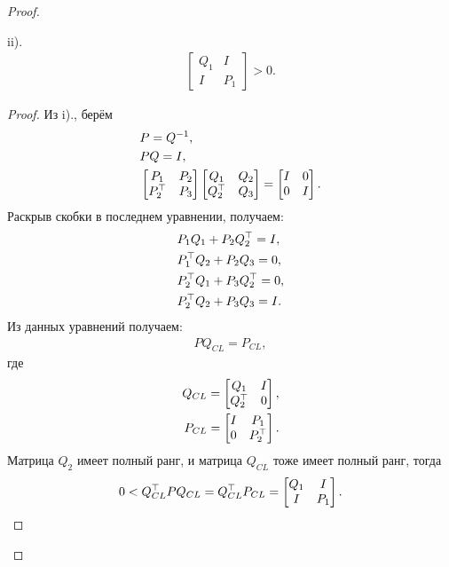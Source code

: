 \begin{proof}
\begin{lemma}
		ii). \begin{align*}
			\begin{bmatrix} 
				{Q}_{1} & I \\ 
				I & {P}_{1}
			\end{bmatrix} > 0.
		\end{align*}
	\end{lemma}
	\begin{proof}
		Из i)., берём 
		\begin{align}
			&{P} = {Q}^{-1},\\
			&{P}{Q}={I},\\
			&\begin{bmatrix} 
				{P}_{1} & {P}_{2}\\ 
				{P}_{2}^\top & {P}_{3} 
			\end{bmatrix}
			\begin{bmatrix} 
				{Q}_{1} & {Q}_{2} \\ 
				{Q}_{2}^\top & {Q}_{3}
			\end{bmatrix} = 
			\begin{bmatrix}
				{I} & 0 \\
				0 & {I}
			\end{bmatrix}.
		\end{align}
		Раскрыв скобки в последнем уравнении, получаем:
		\begin{align}
			&{P}_{1}{Q}_{1}+{P}_{2}{Q}_{2}^\top ={I},\\
			&{P}_{1}^\top{Q}_{2}+{P}_{2}{Q}_{3} =0\label{eq: lemma mult1},\\
			&{P}_{2}^\top{Q}_{1}+{P}_{3}{Q}_{2}^\top=0,\\
			&{P}_{2}^\top{Q}_{2}+{P}_{3}{Q}_{3}= {I} \label{eq: lemma mult2}.
		\end{align}
		Из данных уравнений получаем:
		\begin{align}
			{P}{Q}_{CL}={P}_{CL},
		\end{align}
		где
		\begin{align}
			{Q}_{CL}=
			\begin{bmatrix}
				{Q}_{1} & {I}\\
				{Q}_{2}^\top & 0
			\end{bmatrix},\\
			{P}_{CL}=
			\begin{bmatrix}
				{I} & {P}_{1} \\
				0 & {P}_{2}^\top
			\end{bmatrix}.
		\end{align}
		Матрица ${Q}_{2}$ имеет полный ранг, и матрица ${Q}_{CL}$ тоже имеет полный ранг, тогда
		\begin{align}
			0<{Q}_{CL}^\top {P} {Q}_{CL} = {Q}_{CL}^\top {P}_{CL} = 
			\begin{bmatrix} 
				{Q}_{1} & I \\ 
				I & {P}_{1}
			\end{bmatrix}.
		\end{align}
		

\end{proof}
\end{proof}
